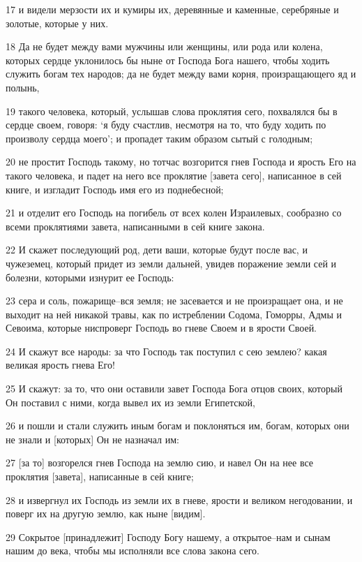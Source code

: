 \par 17 и видели мерзости их и кумиры их, деревянные и каменные, серебряные и золотые, которые у них.
\par 18 Да не будет между вами мужчины или женщины, или рода или колена, которых сердце уклонилось бы ныне от Господа Бога нашего, чтобы ходить служить богам тех народов; да не будет между вами корня, произращающего яд и полынь,
\par 19 такого человека, который, услышав слова проклятия сего, похвалялся бы в сердце своем, говоря: `я буду счастлив, несмотря на то, что буду ходить по произволу сердца моего'; и пропадет таким образом сытый с голодным;
\par 20 не простит Господь такому, но тотчас возгорится гнев Господа и ярость Его на такого человека, и падет на него все проклятие [завета сего], написанное в сей книге, и изгладит Господь имя его из поднебесной;
\par 21 и отделит его Господь на погибель от всех колен Израилевых, сообразно со всеми проклятиями завета, написанными в сей книге закона.
\par 22 И скажет последующий род, дети ваши, которые будут после вас, и чужеземец, который придет из земли дальней, увидев поражение земли сей и болезни, которыми изнурит ее Господь:
\par 23 сера и соль, пожарище--вся земля; не засевается и не произращает она, и не выходит на ней никакой травы, как по истреблении Содома, Гоморры, Адмы и Севоима, которые ниспроверг Господь во гневе Своем и в ярости Своей.
\par 24 И скажут все народы: за что Господь так поступил с сею землею? какая великая ярость гнева Его!
\par 25 И скажут: за то, что они оставили завет Господа Бога отцов своих, который Он поставил с ними, когда вывел их из земли Египетской,
\par 26 и пошли и стали служить иным богам и поклоняться им, богам, которых они не знали и [которых] Он не назначал им:
\par 27 [за то] возгорелся гнев Господа на землю сию, и навел Он на нее все проклятия [завета], написанные в сей книге;
\par 28 и извергнул их Господь из земли их в гневе, ярости и великом негодовании, и поверг их на другую землю, как ныне [видим].
\par 29 Сокрытое [принадлежит] Господу Богу нашему, а открытое--нам и сынам нашим до века, чтобы мы исполняли все слова закона сего.


